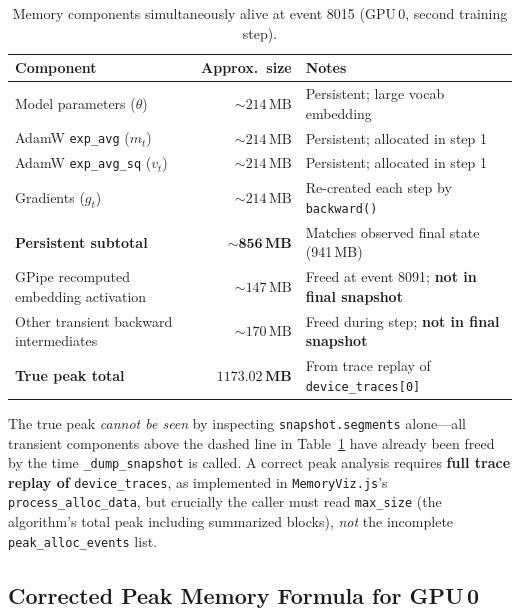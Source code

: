 \documentclass[11pt,a4paper]{article}
\begin{document}
\begin{table}[h]
\centering
\caption{Memory components simultaneously alive at event 8015
(GPU\,0, second training step).}
\label{tab:peak_components}
\begin{tabular}{lrl}
\toprule
\textbf{Component} & \textbf{Approx.\ size} & \textbf{Notes} \\
\midrule
Model parameters ($\theta$)            & $\sim214\,\text{MB}$
  & Persistent; large vocab embedding \\
AdamW \texttt{exp\_avg} ($m_t$)        & $\sim214\,\text{MB}$
  & Persistent; allocated in step 1 \\
AdamW \texttt{exp\_avg\_sq} ($v_t$)    & $\sim214\,\text{MB}$
  & Persistent; allocated in step 1 \\
Gradients ($g_t$)                      & $\sim214\,\text{MB}$
  & Re-created each step by \texttt{backward()} \\
\midrule
\textbf{Persistent subtotal}           & $\mathbf{\sim856\,\text{MB}}$
  & Matches observed final state (941\,MB) \\
\midrule
GPipe recomputed embedding activation  & $\sim147\,\text{MB}$
  & Freed at event 8091; \textbf{not in final snapshot} \\
Other transient backward intermediates & $\sim{170}\,\text{MB}$
  & Freed during step; \textbf{not in final snapshot} \\
\midrule
\textbf{True peak total}               & $\mathbf{1173.02\,\text{MB}}$
  & From trace replay of \texttt{device\_traces[0]} \\
\bottomrule
\end{tabular}
\end{table}

\noindent The true peak \emph{cannot be seen} by inspecting
\texttt{snapshot.segments} alone---all transient components above the dashed
line in Table~\ref{tab:peak_components} have already been freed by the time
\texttt{\_dump\_snapshot} is called.  A correct peak analysis requires
\textbf{full trace replay of} \texttt{device\_traces}, as implemented in
\texttt{MemoryViz.js}'s \texttt{process\_alloc\_data}, but crucially the
caller must read \texttt{max\_size} (the algorithm's total peak including
summarized blocks), \emph{not} the incomplete \texttt{peak\_alloc\_events}
list.

\subsection{Corrected Peak Memory Formula for GPU\,0}
\label{sec:correctedformula}
\end{document}
